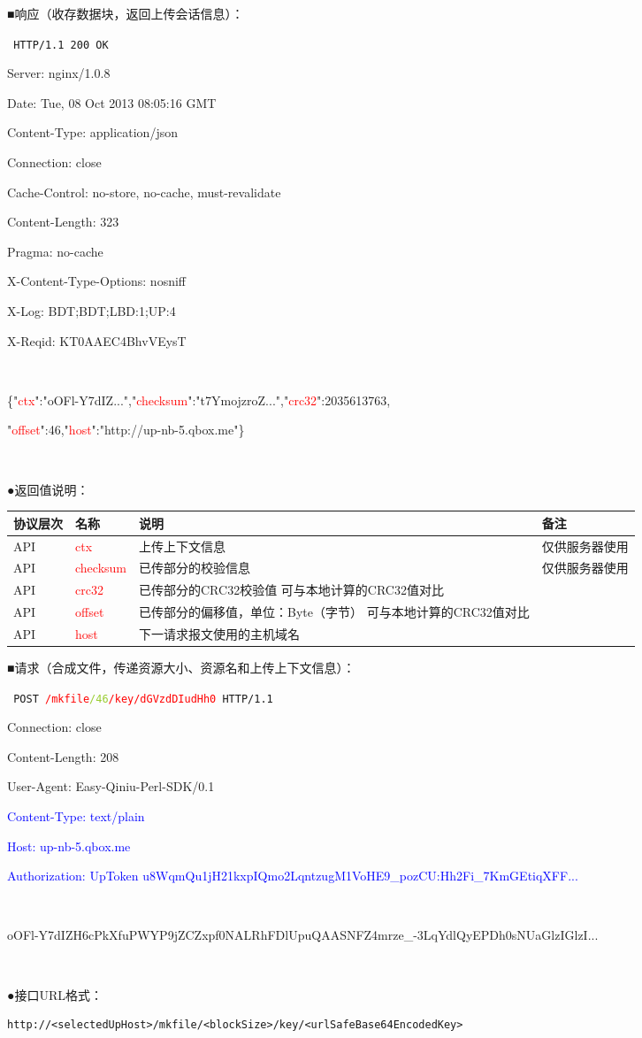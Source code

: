 \documentclass[11pt, oneside]{book}
\newcommand{\qblock}[1]{
\vspace{0.1em}
\noindent
#1\par
\vspace{0.1em}
}
\newcommand{\qtable}[1]{\footnotesize\vspace{0.5em}#1\vspace{0.5em}\normalsize}
\newcommand{\qhttp}[1]{\noindent #1\par}
\begin{document}
\clearpage

\qblock{■\thinspace 响应（收存数据块，返回上传会话信息）：}
{
\tt \footnotesize
\qhttp{HTTP/1.1 200 OK}
\qhttp{Server: nginx/1.0.8}
\qhttp{Date: Tue, 08 Oct 2013 08:05:16 GMT}
\qhttp{Content-Type: application/json}
\qhttp{Connection: close}
\qhttp{Cache-Control: no-store, no-cache, must-revalidate}
\qhttp{Content-Length: 323}
\qhttp{Pragma: no-cache}
\qhttp{X-Content-Type-Options: nosniff}
\qhttp{X-Log: BDT;BDT;LBD:1;UP:4}
\qhttp{X-Reqid: KT0AAEC4BhvVEysT}
\qhttp{\ }
\qhttp{\{"\textcolor{red}{ctx}":"oOFl-Y7dIZ...","\textcolor{red}{checksum}":"t7YmojzroZ...","\textcolor{red}{crc32}":2035613763,}
\qhttp{"\textcolor{red}{offset}":46,"\textcolor{red}{host}":"http://up-nb-5.qbox.me"\}}
\qhttp{\ }
}

\qblock{●\thinspace 返回值说明：}
\qtable{
\def\arraystretch{2}
\begin{tabular}{|l|p{7em}|p{19em}|p{7em}|}
\hline
协议层次 & 名称 & 说明 & 备注 \\
\hline
API & \textcolor{red}{ctx} & 上传上下文信息 & 仅供服务器使用 \\
\hline
API & \textcolor{red}{checksum} & 已传部分的校验信息 & 仅供服务器使用 \\
\hline
API & \textcolor{red}{crc32} & 已传部分的CRC32校验值 \newline 可与本地计算的CRC32值对比 & \\
\hline
API & \textcolor{red}{offset} & 已传部分的偏移值，单位：Byte（字节） \newline 可与本地计算的CRC32值对比 & \\
\hline
API & \textcolor{red}{host} & 下一请求报文使用的主机域名 & \\
\hline
\end{tabular}
}

\clearpage

\qblock{■\thinspace 请求（合成文件，传递资源大小、资源名和上传上下文信息）：}
{
\tt \footnotesize
\qhttp{POST \textcolor{red}{/mkfile}\textcolor{YellowGreen}{/46}\textcolor{red}{/key/dGVzdDIudHh0} HTTP/1.1}
\qhttp{Connection: close}
\qhttp{Content-Length: 208}
\qhttp{User-Agent: Easy-Qiniu-Perl-SDK/0.1}
\qhttp{\textcolor{blue}{Content-Type: text/plain}}
\qhttp{\textcolor{blue}{Host: up-nb-5.qbox.me}}
\qhttp{\textcolor{blue}{Authorization: UpToken u8WqmQu1jH21kxpIQmo2LqntzugM1VoHE9\_pozCU:Hh2Fi\_7KmGEtiqXFF...}}
\qhttp{\ }
\qhttp{\textcolor{YellowOrange}{oOFl-Y7dIZH6cPkXfuPWYP9jZCZxpf0NALRhFDlUpuQAASNFZ4mrze\_-3LqYdlQyEPDh0sNUaGlzIGlzI...}}
\qhttp{\ }
}

\qblock{●\thinspace 接口URL格式：}
\begin{lstlisting}
http://<selectedUpHost>/mkfile/<blockSize>/key/<urlSafeBase64EncodedKey>
\end{lstlisting}
\end{document}
